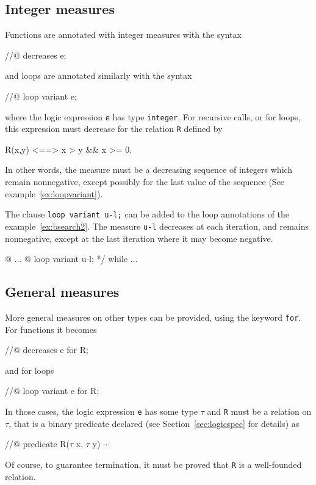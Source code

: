\subsection{Integer measures}
\label{sec:integermeasures}
Functions are annotated with integer measures with the syntax
\begin{listing-nonumber}
//@ decreases e;
\end{listing-nonumber}
and loops are annotated similarly with the syntax
\begin{listing-nonumber}
//@ loop variant e;
\end{listing-nonumber}
where the logic expression \lstinline|e| has type
\lstinline|integer|.
For recursive calls, or for loops, this expression must decrease for
the
relation \lstinline|R| defined by
\begin{listing-nonumber}
R(x,y) <==> x > y && x >= 0.
\end{listing-nonumber}
In other words, the measure must be a decreasing sequence of integers
which remain nonnegative, except possibly for the last value of the
sequence (See example~\ref{ex:loopvariant}).

\begin{example}
  The clause \lstinline|loop variant u-l;| can be added to the loop
  annotations of the example~\ref{ex:bsearch2}.
  The measure \lstinline|u-l| decreases
  at each iteration, and remains nonnegative, except at the last
  iteration where it may become negative.
\begin{listing}{16}
  @ ...
  @ loop variant u-l; */
while ...
\end{listing}
\end{example}

\subsection{General measures}
\label{sec:generalmeasures}

More general measures on other types can be provided, using the
keyword \lstinline|for|. For functions it becomes
\begin{listing-nonumber}
//@ decreases e for R;
\end{listing-nonumber}
and for loops
\begin{listing-nonumber}
//@ loop variant e for R;
\end{listing-nonumber}
In those cases, the logic expression \lstinline|e| has some type
$\tau$ and \lstinline|R|
must be a relation on $\tau$, that is a binary predicate declared
(see Section~\ref{sec:logicspec} for details) as
\begin{listing-nonumber}
//@ predicate R($\tau$ x, $\tau$ y) $\cdots$
\end{listing-nonumber}
Of course, to guarantee
termination, it must be proved that \lstinline|R| is a well-founded relation.

